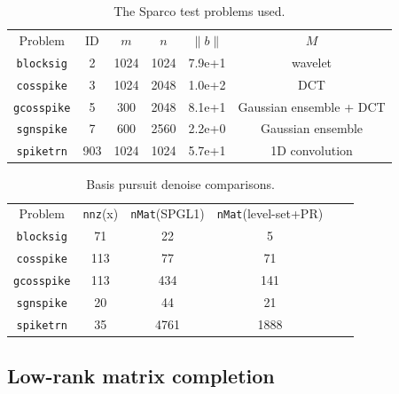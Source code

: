 \begin{table}[t]
    \centering
    \begin{tabular}{cccccc}
        \toprule
        Problem             &   ID &    $m$ &   $n$ &   $\|b\|$ &   $M$\\
        \texttt{blocksig}   &   2  &    1024&   1024&   7.9e+1  &   wavelet\\
        \texttt{cosspike}   &   3  &    1024&   2048&   1.0e+2  &   DCT\\
        \texttt{gcosspike}  &   5  &    300 &   2048&   8.1e+1  &   Gaussian ensemble + DCT\\
        \texttt{sgnspike}   &   7  &    600 &   2560&   2.2e+0  &   Gaussian ensemble\\
        \texttt{spiketrn}   &   903&    1024&   1024&   5.7e+1  &   1D convolution\\
        \bottomrule
    \end{tabular}
    \captionsetup{justification=centering}
    \caption{The Sparco test problems used.}
    \label{tab:sparco_info}
\end{table}

\begin{table}[t]
    \centering
    \begin{tabular}{cccccc}
        \toprule
        Problem             &   \texttt{nnz}(x) &    \texttt{nMat}(SPGL1) & \texttt{nMat}(level-set+PR)\\
        \texttt{blocksig}   &   71              &     22                  &   5\\
        \texttt{cosspike}   &   113             &     77                  &   71\\
        \texttt{gcosspike}  &   113             &    434                  &   141\\
        \texttt{sgnspike}   &   20              &    44                   &   21\\
        \texttt{spiketrn}   &   35              &    4761                 &   1888\\
        \bottomrule
    \end{tabular}
    \captionsetup{justification=centering}
    \caption{Basis pursuit denoise comparisons.}
    \label{tab:bpdn}
\end{table}

\subsection{Low-rank matrix completion} \label{sec:lrmc}

